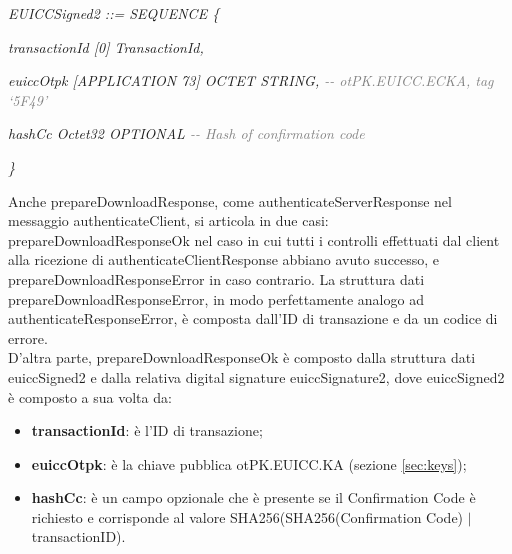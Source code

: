\documentclass[10pt, oneside]{book}
\begin{document}
\textit{EUICCSigned2 ::= SEQUENCE \{}

\hspace{0.75cm} \textit{transactionId [0] TransactionId,}

\hspace{0.75cm} \textit{euiccOtpk [APPLICATION 73] OCTET STRING, \textcolor{gray}{{-}{-} otPK.EUICC.ECKA, tag `5F49'}}

\hspace{0.75cm} \textit{hashCc Octet32 OPTIONAL \textcolor{gray}{{-}{-} Hash of confirmation code}}

\textit{\}\\}

\noindent Anche prepareDownloadResponse, come authenticateServerResponse nel messaggio authenticateClient, si articola in due casi: prepareDownloadResponseOk nel caso in cui tutti i controlli effettuati dal client alla ricezione di authenticateClientResponse abbiano avuto successo, e prepareDownloadResponseError in caso contrario. La struttura dati prepareDownloadResponseError, in modo perfettamente analogo ad authenticateResponseError, è composta dall'ID di transazione e da un codice di errore.\\
D'altra parte, prepareDownloadResponseOk è composto dalla struttura dati euiccSigned2 e dalla relativa digital signature euiccSignature2, dove euiccSigned2 è composto a sua volta da:
\begin{itemize}
\item \textbf{transactionId}: è l'ID di transazione;
\item \textbf{euiccOtpk}: è la chiave pubblica otPK.EUICC.KA (sezione \ref{sec:keys});
\item \textbf{hashCc}: è un campo opzionale che è presente se il Confirmation Code è richiesto e corrisponde al valore SHA256(SHA256(Confirmation Code) $\vert$ transactionID).
\end{itemize}
\end{document}
